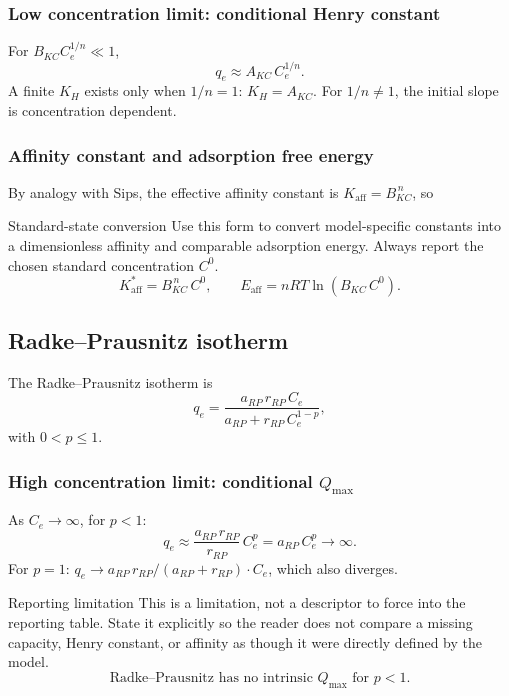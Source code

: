 \documentclass[journal=jacsat,manuscript=article]{achemso}
\begin{document}
\subsubsection{Low concentration limit: conditional Henry constant}

For $B_{KC}C_e^{1/n} \ll 1$,
\begin{equation}
	q_e \approx A_{KC}\, C_e^{1/n}.
\end{equation}
A finite $K_H$ exists only when $1/n = 1$: $K_H = A_{KC}$.
For $1/n \neq 1$, the initial slope is concentration dependent.

\subsubsection{Affinity constant and adsorption free energy}

By analogy with Sips, the effective affinity constant is
$K_{\mathrm{aff}} = B_{KC}^{\,n}$, so
\begin{greenbox}{Standard-state conversion}
	Use this form to convert model-specific constants into a dimensionless affinity and comparable adsorption energy. Always report the chosen standard concentration \(C^0\).
\begin{equation}
	K_{\mathrm{aff}}^{\ast} = B_{KC}^{\,n}\, C^0,
		\qquad
		E_{\mathrm{aff}} = nRT\ln(B_{KC}\, C^0).
\end{equation}
\end{greenbox}

\subsection{Radke--Prausnitz isotherm}
\label{sec:si_radke_prausnitz}

The Radke--Prausnitz isotherm is
\begin{equation}
	q_e = \frac{a_{RP}\, r_{RP}\, C_e}{a_{RP} + r_{RP}\, C_e^{1-p}},
	\label{eq:si_radke_prausnitz}
\end{equation}
with $0 < p \leq 1$.

\subsubsection{High concentration limit: conditional $Q_{\max}$}

As $C_e \to \infty$, for $p < 1$:
\begin{equation}
	q_e \approx \frac{a_{RP}\, r_{RP}}{r_{RP}}\, C_e^{p} = a_{RP}\, C_e^{p} \to \infty.
\end{equation}
For $p = 1$: $q_e \to a_{RP}\, r_{RP}/(a_{RP} + r_{RP}) \cdot C_e$, which also diverges.
\begin{redbox}{Reporting limitation}
	This is a limitation, not a descriptor to force into the reporting table. State it explicitly so the reader does not compare a missing capacity, Henry constant, or affinity as though it were directly defined by the model.
\begin{equation}
	\text{Radke--Prausnitz has no intrinsic } Q_{\max} \text{ for } p < 1.
\end{equation}
\end{redbox}
\end{document}
